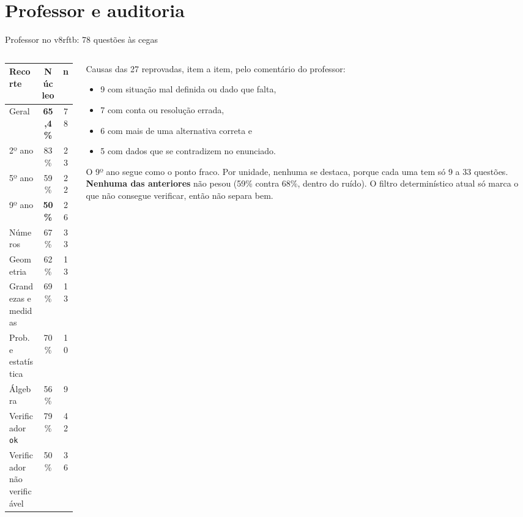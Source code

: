 \documentclass[aspectratio=169,11pt]{beamer}
\begin{document}
\section{Professor e auditoria}
\begin{frame}{Professor no v8rftb: 78 questões às cegas}
  \begin{columns}[T]
    \begin{column}{0.47\textwidth}
      \footnotesize
      \begin{tabular}{@{}lcc@{}}
        \toprule
        Recorte & Núcleo & n \\
        \midrule
        Geral & \textbf{65,4\%} & 78 \\
        2º ano & 83\% & 23 \\
        5º ano & 59\% & 22 \\
        9º ano & \textbf{50\%} & 26 \\
        Números & 67\% & 33 \\
        Geometria & 62\% & 13 \\
        Grandezas e medidas & 69\% & 13 \\
        Prob. e estatística & 70\% & 10 \\
        Álgebra & 56\% & 9 \\
        Verificador \texttt{ok} & 79\% & 42 \\
        Verificador não verificável & 50\% & 36 \\
        \bottomrule
      \end{tabular}
    \end{column}
    \begin{column}{0.5\textwidth}
      \small
      Causas das 27 reprovadas, item a item, pelo comentário do professor:
      \begin{itemize}\footnotesize
        \item 9 com situação mal definida ou dado que falta,
        \item 7 com conta ou resolução errada,
        \item 6 com mais de uma alternativa correta e
        \item 5 com dados que se contradizem no enunciado.
      \end{itemize}
      \footnotesize
      O 9º ano segue como o ponto fraco. Por unidade, nenhuma se destaca, porque cada uma tem só 9 a 33 questões.
      \textbf{Nenhuma das anteriores} não pesou (59\% contra 68\%, dentro do ruído).
      O filtro determinístico atual só marca o que não consegue verificar, então não separa bem.
    \end{column}
  \end{columns}
\end{frame}
\end{document}
